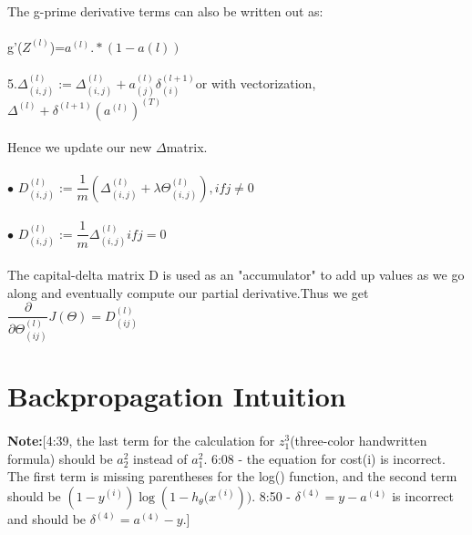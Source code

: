 \documentclass[UTF8]{ctexart}
\begin{document}
{\paragraph{}
The g-prime derivative terms can also be written out as:
\paragraph{}
\begin{algorithm}
g'($Z^{(l)}$)=$a^{(l)}.*(1-a(l))$
\end{algorithm}
\paragraph{}
5.$\Delta_{(i,j)}^{(l)}:=\Delta_{(i,j)}^{(l)}+a_{(j)}^{(l)} \delta_{(i)}^{(l+1)}$or with vectorization,$\Delta^{(l)}+\delta^{(l+1)}(a^{(l)})^{(T)}$
\paragraph{}
Hence we update our new $\Delta$matrix.
\paragraph{}
$\bullet$ $D_{(i,j)}^{(l)}:=\dfrac{1}{m}(\Delta_{(i,j)}^{(l)}+\lambda \Theta_{(i,j)}^{(l)}),if j\neq0$
\paragraph{}
$\bullet$ $D_{(i,j)}^{(l)}:=\dfrac{1}{m} \Delta_{(i,j)}^{(l)} if j=0$
\paragraph{}
The capital-delta matrix D is used as an "accumulator" to add up values as we go along and eventually compute our partial derivative.Thus we get $\dfrac{\partial}{\partial \Theta_{(ij)}^{(l)}} J(\Theta)=D_{(ij)}^{(l)}$
\section{Backpropagation Intuition}
\paragraph{}
\textbf{Note:}[4:39, the last term for the calculation for $z^3_1$(three-color handwritten formula) should be $a^2_2$ instead of $a^2_1$. 6:08 - the equation for cost(i) is incorrect. The first term is missing parentheses for the log() function, and the second term should be $(1-y^{(i)})\log(1-h{_\theta}{(x^{(i)}}))$. 8:50 - $\delta^{(4)} = y - a^{(4)}$ is incorrect and should be $\delta^{(4)} = a^{(4)} - y$.]
}
\end{document}
